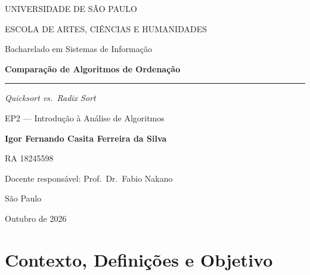\documentclass[11pt,a4paper]{article}
\renewcommand{\_}{\underscoreoriginal\allowbreak}
\begin{document}
\begin{titlepage}
	\centering
	\vspace*{1.5cm}
	{\large UNIVERSIDADE DE SÃO PAULO\par}
	{\large ESCOLA DE ARTES, CIÊNCIAS E HUMANIDADES\par}
	\vspace{0.2cm}
	{\normalsize Bacharelado em Sistemas de Informação\par}

	\vfill

	{\Huge\bfseries Comparação de Algoritmos de Ordenação\par}
	\vspace{0.35cm}
	\textcolor{accentblue}{\rule{0.4\linewidth}{0.6pt}}
	\vspace{0.35cm}
	{\Large\itshape Quicksort vs.\ Radix Sort\par}
	\vspace{0.6cm}
	{\large EP2 --- Introdução à Análise de Algoritmos\par}

	\vfill

	{\large\bfseries Igor Fernando Casita Ferreira da Silva\par}
	{\normalsize RA 18245598\par}

	\vspace{1.2cm}

	{\normalsize Docente responsável: Prof.\ Dr.\ Fabio Nakano\par}

	\vfill

	{\normalsize São Paulo\par}
	{\normalsize Outubro de 2026\par}
	\vspace*{1cm}
\end{titlepage}

\tableofcontents
\listoffigures
\listoftables
\newpage

\setcounter{section}{-1}
\section{Contexto, Definições e Objetivo}
\end{document}
